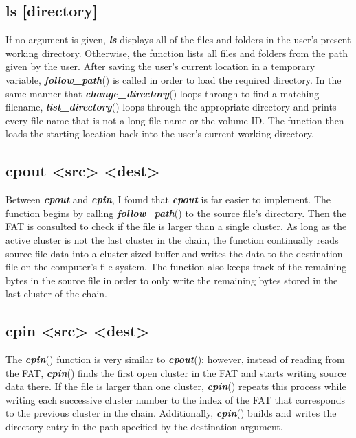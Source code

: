 \documentclass[12pt,letter,titlepage]{article}
\begin{document}
\subsection*{ls [directory]}{
If no argument is given, {\color{orange}\textbf{\textit{ls}}} displays all of the files and folders in the user's present working directory. Otherwise, the function lists all files and folders from the path given by the user. After saving the user's current location in a temporary variable, {\color{cyan}\textbf{\textit{follow\_path}}}() is called in order to load the required directory. In the same manner that {\color{cyan}\textbf{\textit{change\_directory}}}() loops through to find a matching filename, {\color{cyan}\textbf{\textit{list\_directory}}}() loops through the appropriate directory and prints every file name that is not a long file name or the volume ID. The function then loads the starting location back into the user's current working directory.
}
\subsection*{cpout <src> <dest>}{
Between {\color{orange}\textbf{\textit{cpout}}} and {\color{orange}\textbf{\textit{cpin}}}, I found that {\color{orange}\textbf{\textit{cpout}}} is far easier to implement. The function begins by calling {\color{cyan}\textbf{\textit{follow\_path}}}() to the source file's directory. Then the FAT is consulted to check if the file is larger than a single cluster. As long as the active cluster is not the last cluster in the chain, the function continually reads source file data into a cluster-sized buffer and writes the data to the destination file on the computer's file system. The function also keeps track of the remaining bytes in the source file in order to only write the remaining bytes stored in the last cluster of the chain.
}
\subsection*{cpin <src> <dest>}{
The {\color{orange}\textbf{\textit{cpin}}}() function is very similar to {\color{orange}\textbf{\textit{cpout}}}(); however, instead of reading from the FAT, {\color{orange}\textbf{\textit{cpin}}}() finds the first open cluster in the FAT and starts writing source data there. If the file is larger than one cluster, {\color{orange}\textbf{\textit{cpin}}}() repeats this process while writing each successive cluster number to the index of the FAT that corresponds to the previous cluster in the chain. Additionally, {\color{orange}\textbf{\textit{cpin}}}() builds and writes the directory entry in the path specified by the destination argument.
}
\end{document}
